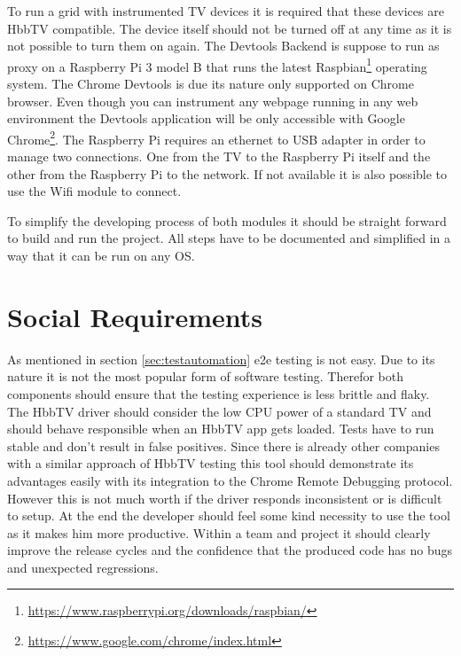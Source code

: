 To run a grid with instrumented TV devices it is required that these devices are HbbTV
compatible. The device itself should not be turned off at any time as it is not possible
to turn them on again. The Devtools Backend is suppose to run as proxy on a Raspberry Pi 3
model B that runs the latest Raspbian\footnote{\url{https://www.raspberrypi.org/downloads/raspbian/}}
operating system. The Chrome Devtools is due its nature only supported on Chrome browser.
Even though you can instrument any webpage running in any web environment the Devtools
application will be only accessible with Google Chrome\footnote{\url{https://www.google.com/chrome/index.html}}.
The Raspberry Pi requires an ethernet to USB adapter in order to manage two connections.
One from the TV to the Raspberry Pi itself and the other from the Raspberry Pi to the network.
If not available it is also possible to use the Wifi module to connect.

To simplify the developing process of both modules it should be straight forward to build
and run the project. All steps have to be documented and simplified in a way that it can
be run on any OS.

\section{Social Requirements\label{sec:socreq}}

As mentioned in section \ref{sec:testautomation} e2e testing is not easy. Due to its nature it
is not the most popular form of software testing. Therefor both components should ensure that
the testing experience is less brittle and flaky. The HbbTV driver should consider the low
CPU power of a standard TV and should behave responsible when an HbbTV app gets loaded. Tests
have to run stable and don't result in false positives. Since there is already other companies
with a similar approach of HbbTV testing this tool should demonstrate its advantages easily
with its integration to the Chrome Remote Debugging protocol. However this is not much worth
if the driver responds inconsistent or is difficult to setup. At the end the developer should
feel some kind necessity to use the tool as it makes him more productive. Within a team and
project it should clearly improve the release cycles and the confidence that the produced code
has no bugs and unexpected regressions.
